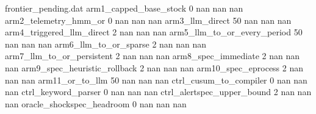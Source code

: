 
\begin{filecontents*}{frontier_pending.dat}
arm1_capped_base_stock             0     nan     nan     nan
arm2_telemetry_hmm_or              0     nan     nan     nan
arm3_llm_direct                   50     nan     nan     nan
arm4_triggered_llm_direct          2     nan     nan     nan
arm5_llm_to_or_every_period       50     nan     nan     nan
arm6_llm_to_or_sparse              2     nan     nan     nan
arm7_llm_to_or_persistent          2     nan     nan     nan
arm8_spec_immediate                2     nan     nan     nan
arm9_spec_heuristic_rollback       2     nan     nan     nan
arm10_spec_eprocess                2     nan     nan     nan
arm11_or_to_llm                   50     nan     nan     nan
ctrl_cusum_to_compiler             0     nan     nan     nan
ctrl_keyword_parser                0     nan     nan     nan
ctrl_alertspec_upper_bound         2     nan     nan     nan
oracle_shockspec_headroom          0     nan     nan     nan
\end{filecontents*}

